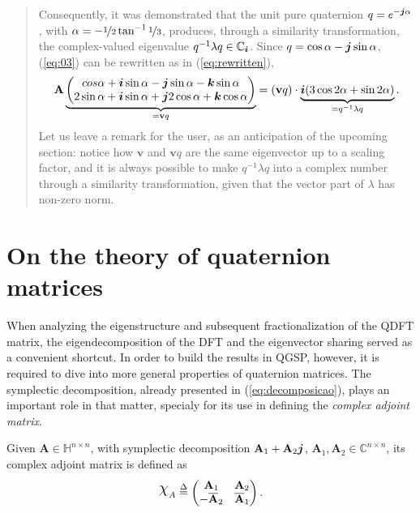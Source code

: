 \begin{quotation}
\begin{example}
        Consequently, it was demonstrated that the unit pure quaternion $ q = e^{- \boldsymbol{j} \alpha} $, with $ \alpha = - \displaystyle \nicefrac{1}{2} \tan^{-1} \nicefrac{1}{3} $, produces, through a similarity transformation, the complex-valued eigenvalue $ q^{-1} \lambda q \in \mathbb{C}_{\boldsymbol{i}}$. Since $q = \cos \alpha - \boldsymbol{j} \sin \alpha $, (\ref{eq:03}) can be rewritten as in (\ref{eq:rewritten}),
        \begin{equation}
            \mathbf{A} \underbrace{\begin{pmatrix}
                    cos \alpha + \boldsymbol{i} \sin \alpha - \boldsymbol{j} \sin \alpha - \boldsymbol{k} \sin \alpha \\
                    2 \sin \alpha + \boldsymbol{i} \sin \alpha + \boldsymbol{j} 2 \cos \alpha + \boldsymbol{k} \cos \alpha
                \end{pmatrix}}_{= \mathbf{v} q} =
            (\mathbf{v} q) \cdot \underbrace{\boldsymbol{i} (3 \cos 2\alpha + \sin 2\alpha)}_{= q^{-1} \lambda q}.
        \end{equation}
        Let us leave a remark for the user, as an anticipation of the upcoming section: notice how $\mathbf{v}$ and $\mathbf{v}q$ are the same eigenvector up to a scaling factor, and it is always possible to make $q^{-1} \lambda q$ into a complex number through a similarity transformation, given that the vector part of $\lambda$ has non-zero norm.
    \end{example}
\end{quotation}


\section{On the theory of quaternion matrices}

When analyzing the eigenstructure and subsequent fractionalization of the QDFT matrix, the eigendecomposition of the DFT and the eigenvector sharing served as a convenient shortcut. In order to build the results in QGSP, however, it is required to dive into more general properties of quaternion matrices. The symplectic decomposition, already presented in (\ref{eq:decomposicao}), plays an important role in that matter, specialy for its use in defining the \textit{complex adjoint matrix}.

\begin{definition}
    \label{def:complexadjoint}
    Given $ \mathbf{A} \in \mathbb{H}^{n \times n} $, with symplectic decomposition $ \mathbf{A}_1 + \mathbf{A}_2 \boldsymbol{j}$, $ \mathbf{A}_1,\mathbf{A}_2 \in \mathbb{C}^{n \times n} $, its complex adjoint matrix is defined as
    \begin{equation}
        \rchi_{A} \overset{\Delta}{=}
        \begin{pmatrix}
            \mathbf{A}_1              & \mathbf{A}_2            \\
            - \overline{\mathbf{A}}_2 & \overline{\mathbf{A}}_1
        \end{pmatrix}.
    \end{equation}
\end{definition}

